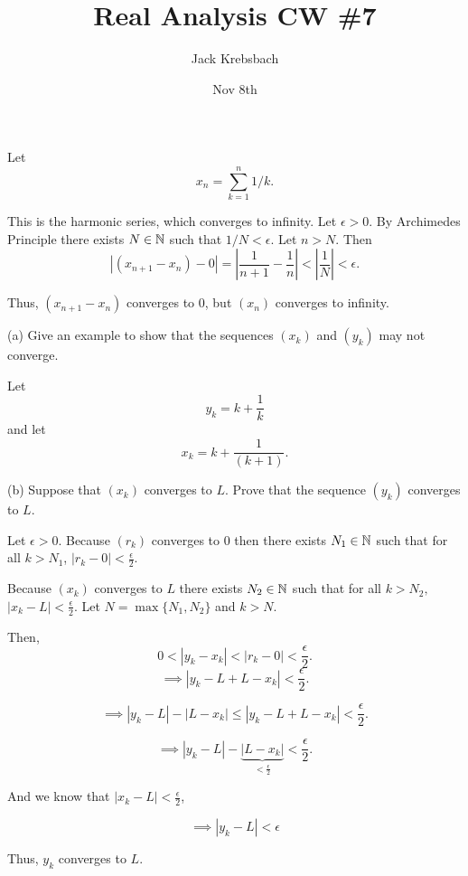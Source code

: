 \documentclass{report}
\title{Real Analysis CW \#7}
\author{Jack Krebsbach }
\date{Nov 8th}
\begin{document}
\maketitle
{}

\sol
Let $$x_n= \sum_{k=1}^{n} 1/k.$$

This is the harmonic series, which converges to infinity. Let $\epsilon>0.$ By Archimedes Principle there exists $N \in \NN$ such that $1/N < \epsilon.$ Let $n>N.$ Then $$|(x_{n+1} - x_n) -0 | = \left|\frac{1}{n+1} - \frac{1}{n}\right| < \left|\frac{1}{N} \right| < \epsilon.$$

Thus, $\left(x_{n+1}-x_n\right)$ converges to 0, but $(x_n)$ converges to infinity.

\bigskip
{}

\bigskip
(a) Give an example to show that the sequences $\left(x_k\right)$ and $\left(y_k\right)$ may not converge.
\bigskip

\sol
Let $$y_k = k + \frac{1}{k}$$ and let $$x_k = k +\frac{1}{(k+1)}.$$

\bigskip
\bigskip
\bigskip
(b) Suppose that $\left(x_k\right)$ converges to $L$. Prove that the sequence $\left(y_k\right)$ converges to $L$.

\begin{myproof}
    Let $\epsilon >0.$ Because $(r_k)$ converges to $0$ then there exists $N_1 \in \NN$ such that for all $k>N_1$, $\left|r_k - 0 \right| < \frac{\epsilon}{2}.$

    Because $(x_k)$ converges to $L$ there exists $N_2 \in \NN$ such that for all $k>N_2,$ $\left| x_k -L\right| < \frac{\epsilon}{2}.$ Let $N = \max\{N_1,N_2\}$ and $k> N.$

    Then, $$0 < \left| y_k - x_k \right| < \left|r_k -0\right| < \frac{\epsilon}{2}.$$
$$\implies \left| y_k - L + L - x_k \right| < \frac{\epsilon}{2}.$$

$$\implies \left| y_k - L\right|  - \left|L - x_k \right| \leq \left| y_k - L + L - x_k \right|< \frac{\epsilon}{2}.$$

$$\implies \left| y_k - L\right|  - \underbrace{\left|L - x_k \right|}_{< \frac{\epsilon}{2}} < \frac{\epsilon}{2}.$$

And we know that $\left| x_k -L\right| < \frac{\epsilon}{2}$,

$$\implies \left| y_k - L\right| < \epsilon$$

Thus, $y_k$ converges to $L.$
\end{myproof}
\end{document}
